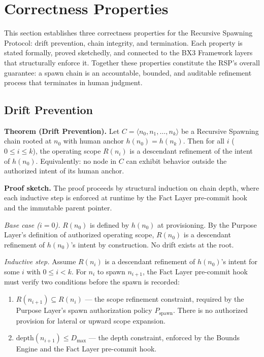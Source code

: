 \section{Correctness Properties}
\label{sec:rs-correctness}

This section establishes three correctness properties for the Recursive Spawning Protocol: drift prevention, chain integrity, and termination. Each property is stated formally, proved sketchedly, and connected to the BX3 Framework layers that structurally enforce it. Together these properties constitute the RSP's overall guarantee: a spawn chain is an accountable, bounded, and auditable refinement process that terminates in human judgment.

\subsection{Drift Prevention}
\label{sec:rs-drift-prevention}

\noindent\textbf{Theorem (Drift Prevention).} Let $C = \langle n_0, n_1, \ldots, n_k \rangle$ be a Recursive Spawning chain rooted at $n_0$ with human anchor $h(n_0) = h(n_k)$. Then for all $i$ ($0 \leq i \leq k$), the operating scope $R(n_i)$ is a descendant refinement of the intent of $h(n_0)$. Equivalently: no node in $C$ can exhibit behavior outside the authorized intent of its human anchor.

\medskip
\noindent\textbf{Proof sketch.} The proof proceeds by structural induction on chain depth, where each inductive step is enforced at runtime by the Fact Layer pre-commit hook and the immutable parent pointer.

\medskip
\noindent\textit{Base case ($i=0$).} $R(n_0)$ is defined by $h(n_0)$ at provisioning. By the Purpose Layer's definition of authorized operating scope, $R(n_0)$ is a descendant refinement of $h(n_0)$'s intent by construction. No drift exists at the root.

\medskip
\noindent\textit{Inductive step.} Assume $R(n_i)$ is a descendant refinement of $h(n_0)$'s intent for some $i$ with $0 \leq i < k$. For $n_i$ to spawn $n_{i+1}$, the Fact Layer pre-commit hook must verify two conditions before the spawn is recorded:

\begin{enumerate}
    \item[(a)] $R(n_{i+1}) \subseteq R(n_i)$ — the scope refinement constraint, required by the Purpose Layer's spawn authorization policy $P_{\mathrm{spawn}}$. There is no authorized provision for lateral or upward scope expansion.
    \item[(b)] $\mathrm{depth}(n_{i+1}) \leq D_{\mathrm{max}}$ — the depth constraint, enforced by the Bounds Engine and the Fact Layer pre-commit hook.
\end{enumerate}

